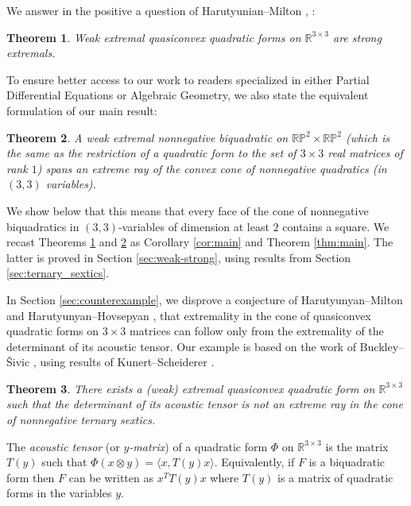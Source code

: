 \documentclass[a4paper]{article}
\numberwithin{equation}{section}
\newcommand{\R}{\mathbb{R}}
\renewcommand{\P}{\mathbb{P}}
\newtheorem{theorem}{Theorem}[section]
\theoremstyle{definition}
\theoremstyle{remark}
\begin{document}
We answer in the positive a question of Harutyunian--Milton \cite[Conj. 2.8]{HarutyunyanMiltonCPAM},  \cite[Conj. 2.7]{harutyunyan2021extreme}:
\begin{theorem}\label{thm:mintro}
Weak extremal quasiconvex quadratic forms on $\R^{3\times 3}$ are strong extremals.
\end{theorem}

To ensure better access to our work to readers specialized in either Partial Differential Equations or Algebraic Geometry, we also state the equivalent formulation of our main result:
\begin{theorem}\label{thm:mintro2}
A weak extremal nonnegative biquadratic on $\R\P^2\times \R\P^2$ (which is the same as the restriction of a quadratic form to the set of $3\times 3$ real matrices of rank $1$) spans an extreme ray of the convex cone of nonnegative quadratics (in $(3,3)$ variables).
\end{theorem}

We show below that this means that every face of the cone of nonnegative biquadratics in $(3,3)$-variables of dimension at least $2$ contains a square. We recast Theorems \ref{thm:mintro} and \ref{thm:mintro2} as Corollary \ref{cor:main} and Theorem \ref{thm:main}. The latter is proved in Section \ref{sec:weak-strong}, using results from Section \ref{sec:ternary_sextics}.

In Section \ref{sec:counterexample}, we disprove a conjecture of Harutyunyan--Milton \cite[Conj. 2.8]{HarutyunyanMiltonCPAM} and Harutyunyan--Hovsepyan \cite{harutyunyan2021extreme}, 
that extremality in the cone of quasiconvex quadratic forms on $3\times 3$ matrices can follow only from the extremality of the determinant of its acoustic tensor. Our example is based on the work of Buckley--\v{S}ivic \cite{BS2020}, using results of Kunert--Scheiderer \cite{KS2018}.

\begin{theorem}\label{thm:main-ext_not_ext_det}
There exists a (weak) extremal quasiconvex quadratic form on $\R^{3\times 3}$ such that the determinant of its acoustic tensor is not an extreme ray in the cone of nonnegative ternary sextics.
\end{theorem}

The \emph{acoustic tensor} (or \emph{$y$-matrix}) of a quadratic form $\Phi$ on $\R^{3\times 3}$ is the matrix $T(y)$ such that $\Phi(x\otimes y)=\langle x,T(y)x\rangle$. Equivalently, if $F$ is a biquadratic form then $F$ can be written as $x^TT(y)x$ where $T(y)$ is a matrix of quadratic forms in the variables $y$.
\end{document}
